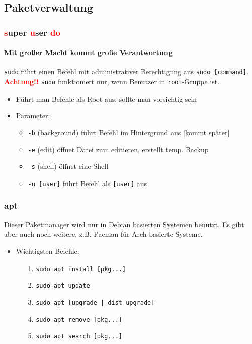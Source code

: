 \documentclass[12pt,utf8]{beamer}
\begin{document}
\subsection{Paketverwaltung}
\begin{frame}
	\frametitle{\textcolor{red}{s}uper \textcolor{red}{u}ser \textcolor{red}{do}}
	\framesubtitle{\textcolor{ownDarkOr}{Mit großer Macht kommt große Verantwortung}}
	\texttt{sudo} führt einen Befehl mit administrativer Berechtigung aus \texttt{sudo [command]}.
	\textbf{\textcolor{red}{Achtung!!}} \texttt{sudo} funktioniert nur, wenn Benutzer in \texttt{root}-Gruppe ist.
	\begin{itemize}
		\item Führt man Befehle als Root aus, sollte man vorsichtig sein
		\item Parameter:
		\begin{itemize}[<+->]
			\item {\scriptsize \texttt{-b} (background) führt Befehl im Hintergrund aus [kommt später]}
			\item {\scriptsize \texttt{-e} (edit) öffnet Datei zum editieren, erstellt temp. Backup}
			\item {\scriptsize \texttt{-s} (shell) öffnet eine Shell}
			\item {\scriptsize \texttt{-u [user]} führt Befehl als \texttt{[user]} aus}
		\end{itemize}
	\end{itemize}
\end{frame}

\begin{frame}
	\frametitle{apt}
	Dieser Paketmanager wird nur in Debian basierten Systemen benutzt. Es gibt aber auch noch weitere, z.B. Pacman für Arch basierte Systeme.
	\begin{itemize}
		\item Wichtigsten Befehle:
		\begin{itemize}
			\item[1.] \texttt{sudo apt install [pkg...]}
			\item[2.] \texttt{sudo apt update}
			\item[3.] \texttt{sudo apt [upgrade | dist-upgrade]}
			\item[4.] \texttt{sudo apt remove [pkg...]}
			\item[5.] \texttt{sudo apt search [pkg...]}
		\end{itemize}
	\end{itemize}
\end{frame}
\end{document}
